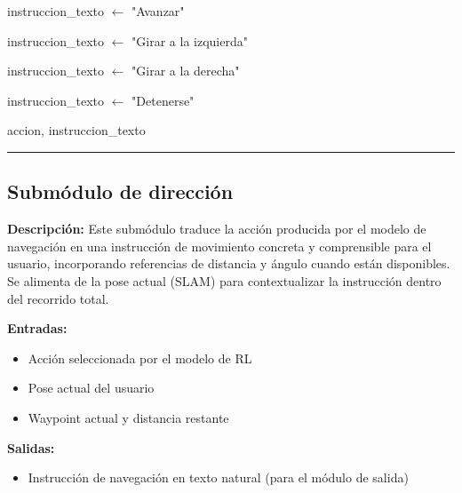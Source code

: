 \begin{algorithmic}[1]

    \State instruccion\_texto $\gets$ "Avanzar"

\EndIf

\Statex


    \State instruccion\_texto $\gets$ "Girar a la izquierda"

\EndIf

\Statex


    \State instruccion\_texto $\gets$ "Girar a la derecha"

\EndIf

\Statex


    \State instruccion\_texto $\gets$ "Detenerse"

\EndIf

\Statex
\State \Return accion, instruccion\_texto

\end{algorithmic}
\vspace{-0.9cm}
\rule{\textwidth}{0.4pt}

\subsection{Submódulo de dirección}

\textbf{Descripción:}
Este submódulo traduce la acción producida por el modelo de navegación en una instrucción
de movimiento concreta y comprensible para el usuario, incorporando referencias de
distancia y ángulo cuando están disponibles. Se alimenta de la pose actual (SLAM) para
contextualizar la instrucción dentro del recorrido total.

\textbf{Entradas:}
\begin{itemize}
    \item Acción seleccionada por el modelo de RL
    \item Pose actual del usuario
    \item Waypoint actual y distancia restante
\end{itemize}

\textbf{Salidas:}
\begin{itemize}
    \item Instrucción de navegación en texto natural (para el módulo de salida)
\end{itemize}

